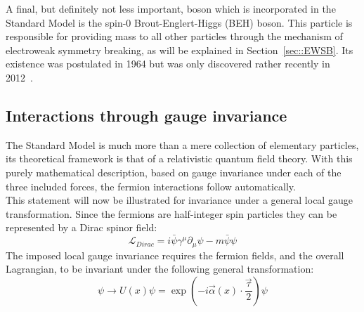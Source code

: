 A final, but definitely not less important, boson which is incorporated in the Standard Model is the spin-0 Brout-Englert-Higgs (BEH) boson. This particle is responsible for providing mass to all other particles through the mechanism of electroweak symmetry breaking, as will be explained in Section~\ref{sec::EWSB}. Its existence was postulated in 1964 but was only discovered rather recently in 2012~\cite{HiggsDiscCMS, HiggsDiscAtlas}.

\subsection{Interactions through gauge invariance}
The Standard Model is much more than a mere collection of elementary particles, its theoretical framework is that of a relativistic quantum field theory.
With this purely mathematical description, based on gauge invariance under each of the three included forces, the fermion interactions follow automatically. 
\\
This statement will now be illustrated for invariance under a general local gauge transformation. Since the fermions are half-integer spin particles they can be represented by a Dirac spinor field:
\begin{equation} \label{eq::DiracL}
 \mathcal{L}_{Dirac} = i \bar{\psi} \gamma^{\mu} \partial_{\mu} \psi - m \bar{\psi} \psi
\end{equation}
The imposed local gauge invariance requires the fermion fields, and the overall Lagrangian, to be invariant under the following general transformation:
\begin{equation} \label{eq::GaugeTransf}
 \psi \rightarrow U(x) \psi =  \exp \left( -i \vec{\alpha}(x) \cdot \frac{\vec{\tau}}{2} \right) \psi
\end{equation}

